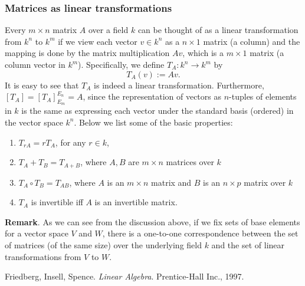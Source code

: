 \documentclass[12pt]{article}
\begin{document}
\subsubsection*{Matrices as linear transformations}

Every $m\times n$ matrix $A$ over a field $k$ can be thought of as a linear transformation from $k^n$ to $k^m$ if we view each vector $v\in k^n$ as a $n\times 1$ matrix (a column) and the mapping is done by the matrix multiplication $Av$, which is a $m\times 1$ matrix (a column vector in $k^m$).  Specifically, we define $T_A:k^n\to k^m$ by $$T_A(v):=Av.$$  It is easy to see that $T_A$ is indeed a linear transformation.  Furthermore, $[T_A]=[T_A]^{E_n}_{E_m}=A$, since the representation of vectors as $n$-tuples of elements in $k$ is the same as expressing each vector under the standard basis (ordered) in the vector space $k^n$.  Below we list some of the basic properties:

\begin{enumerate}
\item $T_{rA}=rT_A$, for any $r\in k$,
\item $T_A+T_B=T_{A+B}$, where $A,B$ are $m\times n$ matrices over $k$
\item $T_A\circ T_B=T_{AB}$, where $A$ is an $m\times n$ matrix and $B$ is an $n\times p$ matrix over $k$
\item $T_A$ is invertible iff $A$ is an invertible matrix.
\end{enumerate}

\textbf{Remark}.  As we can see from the discussion above, if we fix sets of base elements for a vector space $V$ and $W$, there is a one-to-one correspondence between the set of matrices (of the same size) over the underlying field $k$ and the set of linear transformations from $V$ to $W$.

\begin{thebibliography}{3}
 Friedberg, Insell, Spence. {\it Linear Algebra}. Prentice-Hall Inc., 1997.
\end{thebibliography}
\end{document}
